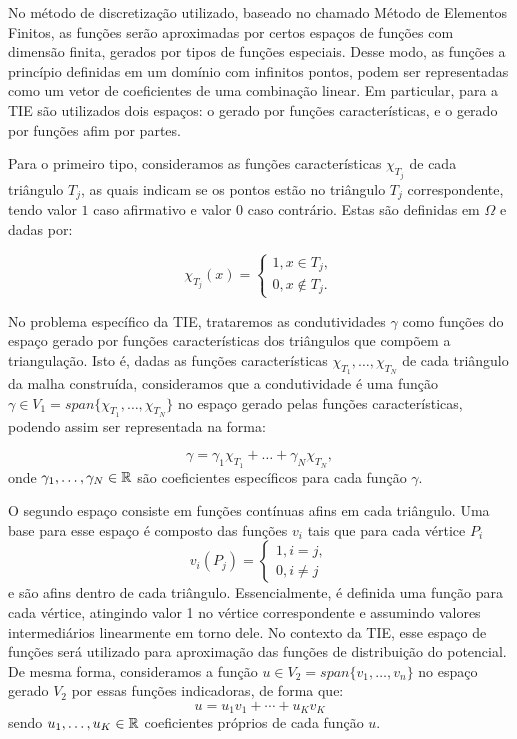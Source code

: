No método de discretização utilizado, baseado no chamado Método de Elementos Finitos, as funções serão aproximadas por certos espaços de funções com dimensão finita, gerados por tipos de funções especiais. Desse modo, as funções a princípio definidas em um domínio com infinitos pontos, podem ser representadas como um vetor de coeficientes de uma combinação linear. Em particular, para a TIE são utilizados dois espaços: o gerado por funções características, e o gerado por funções afim por partes.

Para o primeiro tipo, consideramos as funções características $\chi_{T_j}$ de cada triângulo $T_j$, as quais indicam se os pontos estão no triângulo $T_j$ correspondente, tendo valor $1$ caso afirmativo e valor $0$ caso contrário. Estas são definidas em $\Omega$ e dadas por:

\begin{equation}
    \chi_{T_j} (x) = \begin{cases}
        1, x \in T_j , \\
        0, x \notin T_j.
    \end{cases}
\end{equation}

No problema específico da TIE, trataremos as condutividades $\gamma$ como funções do espaço gerado por funções características dos triângulos que compõem a triangulação. Isto é, dadas as funções características $\chi_{T_1}, \dots, \chi_{T_N}$ de cada triângulo da malha construída, consideramos que a condutividade é uma função $\gamma \in V_1 = span\{\chi_{T_1}, \dots,\chi_{T_N}\}$ no espaço gerado pelas funções características, podendo assim ser representada na forma:

\begin{equation} \label{eq:gamma-expansao}
    \gamma = \gamma_1 \chi_{T_1} + \dots + \gamma_N \chi_{T_N},
\end{equation}
onde $\gamma_1, \dots, \gamma_N \in \mathbb{R}$ são coeficientes específicos para cada função $\gamma$.

O segundo espaço consiste em funções contínuas afins em cada triângulo. Uma base para esse espaço é composto das funções $v_i$ tais que para cada vértice $P_i$
\begin{equation}
    v_i (P_j) = \begin{cases}
        1, i=j , \\
        0, i \neq j
    \end{cases}
\end{equation}
e são afins dentro de cada triângulo. Essencialmente, é definida uma função para cada vértice, atingindo valor 1 no vértice correspondente e assumindo valores intermediários linearmente em torno dele. No contexto da TIE, esse espaço de funções será utilizado para aproximação das funções de distribuição do potencial. De mesma forma, consideramos a função $u \in V_2 = span\{v_1, \dots, v_n\}$ no espaço gerado $V_2$ por essas funções indicadoras, de forma que:
\begin{equation}\label{eq:u-expansao}
    u = u_1 v_1 + \cdots + u_K v_K
\end{equation}
sendo $u_1,\dots, u_K\in \mathbb{R}$ coeficientes próprios de cada função $u$.

